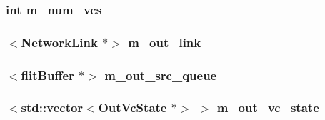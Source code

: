 \label{classRouter_a6f69c0ff922be798fa1cfce69f83244e}
\hypertarget{classRouter_a2e1a9213321dfa0386cdedaf6fc22996}{
\subsubsection[{m\_\-num\_\-vcs}]{\setlength{\rightskip}{0pt plus 5cm}int {\bf m\_\-num\_\-vcs}}}
\label{classRouter_a2e1a9213321dfa0386cdedaf6fc22996}
\hypertarget{classRouter_a2c9a37a8e348b31100b016ef9b51b235}{
\subsubsection[{m\_\-out\_\-link}]{$<${\bf NetworkLink} $\ast$$>$ {\bf m\_\-out\_\-link}}}
\label{classRouter_a2c9a37a8e348b31100b016ef9b51b235}
\hypertarget{classRouter_a1022c5b57cefcbc48cc2b28e5b15f12e}{
\subsubsection[{m\_\-out\_\-src\_\-queue}]{$<${\bf flitBuffer} $\ast$$>$ {\bf m\_\-out\_\-src\_\-queue}}}
\label{classRouter_a1022c5b57cefcbc48cc2b28e5b15f12e}
\hypertarget{classRouter_ac42fe6cf02410262c5525a2abcc921b6}{
\subsubsection[{m\_\-out\_\-vc\_\-state}]{$<${\bf std::vector}$<${\bf OutVcState} $\ast$$>$ $>$ {\bf m\_\-out\_\-vc\_\-state}}}
\label{classRouter_ac42fe6cf02410262c5525a2abcc921b6}
